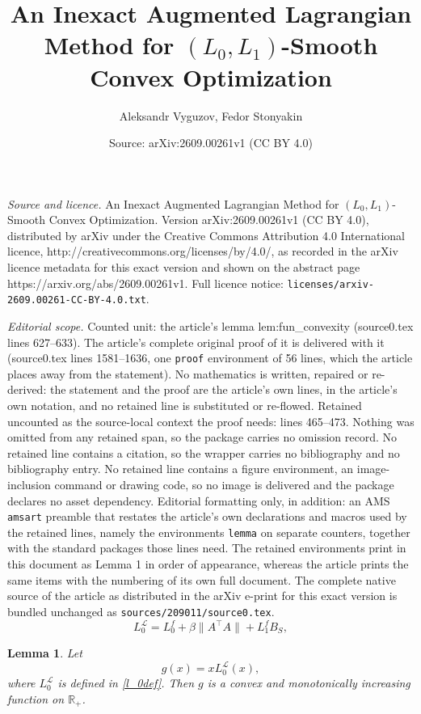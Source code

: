 \documentclass[10pt,a4paper]{amsart}
\title{An Inexact Augmented Lagrangian Method for $(L_0,L_1)$-Smooth Convex Optimization}
\author{Aleksandr Vyguzov, Fedor Stonyakin}
\date{Source: arXiv:2609.00261v1 (CC BY 4.0)}
\newtheorem{lemma}{Lemma}
\begin{document}
\maketitle

\noindent\emph{Source and licence.} An Inexact Augmented Lagrangian Method for $(L_0,L_1)$-Smooth Convex Optimization. Version arXiv:2609.00261v1 (CC BY 4.0), distributed by arXiv under the Creative Commons Attribution 4.0 International licence, http://creativecommons.org/licenses/by/4.0/, as recorded in the arXiv licence metadata for this exact version and shown on the abstract page https://arxiv.org/abs/2609.00261v1. Full licence notice: \texttt{licenses/arxiv-2609.00261-CC-BY-4.0.txt}.\par\smallskip

\noindent\textit{Editorial scope.} Counted unit: the article's lemma lem:fun\_convexity (source0.tex lines 627--633). The article's complete original proof of it is delivered with it (source0.tex lines 1581--1636, one \texttt{proof} environment of 56 lines, which the article places away from the statement). No mathematics is written, repaired or re-derived: the statement and the proof are the article's own lines, in the article's own notation, and no retained line is substituted or re-flowed.  Retained uncounted as the source-local context the proof needs: lines 465--473.  Nothing was omitted from any retained span, so the package carries no omission record.  No retained line contains a citation, so the wrapper carries no bibliography and no bibliography entry.  No retained line contains a figure environment, an image-inclusion command or drawing code, so no image is delivered and the package declares no asset dependency.  Editorial formatting only, in addition: an AMS \texttt{amsart} preamble that restates the article's own declarations and macros used by the retained lines, namely the environments \texttt{lemma} on separate counters, together with the standard packages those lines need.  The retained environments print in this document as Lemma 1 in order of appearance, whereas the article prints the same items with the numbering of its own full document.  The complete native source of the article as distributed in the arXiv e-print for this exact version is bundled unchanged as \texttt{sources/209011/source0.tex}.
		\begin{equation}\label{l_0def}
			L_0^{\mathcal{L}}
			=
			L_0^f
			+
			\beta\|A^\top A\|
			+
			L_1^f B_S,
		\end{equation}

	\begin{lemma}\label{lem:fun_convexity}
		Let
		\[
		g(x)=xL_0^{\mathcal L}(x),
		\]
		where $L_0^{\mathcal L}$ is defined in \eqref{l_0def}. Then $g$ is a convex and monotonically increasing function on $\mathbb{R}_+$.
	\end{lemma}
\end{document}
